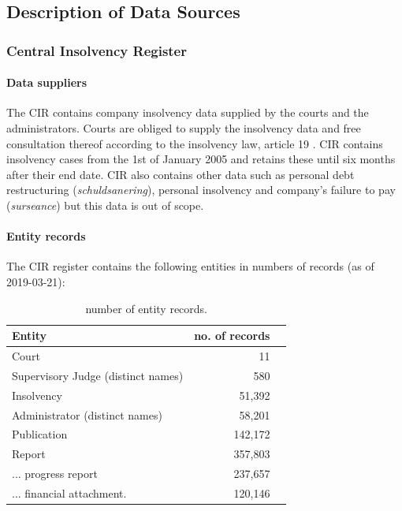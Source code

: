 \subsection{Description of Data Sources}
\subsubsection{Central Insolvency Register}
\paragraph{Data suppliers}
The CIR contains company insolvency data supplied by the courts and the administrators. Courts are obliged to supply the insolvency data and free consultation thereof according to the insolvency law, article 19 \cite{law:1}. CIR contains insolvency cases from the 1st of January 2005 and retains these until six months after their end date. CIR also contains other data such as personal debt restructuring (\textit{schuldsanering}), personal insolvency and company's failure to pay (\textit{surseance}) but this data is out of scope.

\paragraph{Entity records}
The CIR register contains the following entities in numbers of records (as of 2019-03-21):

\begin{table}[h]
\caption{number of entity records.}
\centering
\begin{tabular}{l r r}
\hline\hline
Entity & no. of records\\
\hline
Court & 11 \\
Supervisory Judge (distinct names) & 580 \\
Insolvency & 51,392 \\
Administrator (distinct names) & 58,201 \\
Publication & 142,172 \\
Report & 357,803 \\
... progress report & 237,657 \\
... financial attachment. & 120,146 \\
\hline
\end{tabular}
\label{table:cir_contents}
\end{table}


